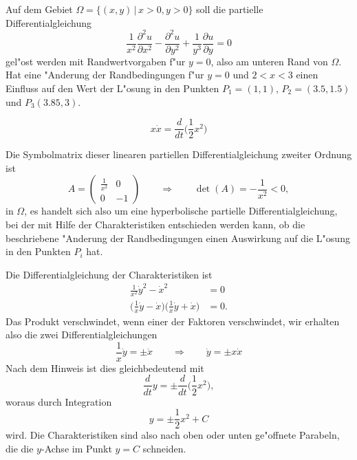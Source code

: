 Auf dem Gebiet $\Omega = \{(x,y)\,|\, x>0,y>0\}$ soll die partielle
Differentialgleichung
\begin{equation}
\frac1{x^2}\frac{\partial^2u}{\partial x^2}
-\frac{\partial^2 u}{\partial y^2}+\frac1{y^3}\frac{\partial u}{\partial y}=0
\label{90000012:equation}
\end{equation}
gel"ost werden mit Randwertvorgaben f"ur $y=0$, also am unteren Rand von
$\Omega$.
Hat eine "Anderung der Randbedingungen f"ur $y=0$ und $2<x<3$ einen Einfluss
auf den Wert der L"osung in den Punkten 
$P_1=(1,1)$, $P_2=(3.5,1.5)$ und $P_3(3.85,3)$.

\begin{hinweis}
\[
x\dot x=\frac{d}{dt}\bigl(
{\textstyle \frac12}x^2
\bigr)
\]
\end{hinweis}

\begin{loesung}
Die Symbolmatrix dieser linearen partiellen Differentialgleichung zweiter
Ordnung ist
\[
A=\begin{pmatrix}
\frac1{x^2}&0\\0&-1
\end{pmatrix}
\qquad
\Rightarrow
\qquad
\det(A)=-\frac1{x^2}<0,
\]
in $\Omega$, es handelt sich also um eine hyperbolische partielle 
Differentialgleichung, bei der mit Hilfe der Charakteristiken
entschieden werden kann, ob die beschriebene "Anderung der Randbedingungen
einen Auswirkung auf die L"osung in den Punkten $P_i$ hat.

Die Differentialgleichung der Charakteristiken ist
\begin{align*}
\frac1{x^2}\dot y^2-\dot x^2&=0
\\
\biggl(\frac1x \dot y-\dot x\biggr)
\biggl(\frac1x \dot y+\dot x\biggr)
&=0.
\end{align*}
Das Produkt verschwindet, wenn einer der Faktoren verschwindet, wir erhalten
also die zwei Differentialgleichungen
\[
\frac1x\dot y=\pm\dot x
\qquad
\Rightarrow
\qquad
\dot y=\pm x\dot x
\]
Nach dem Hinweis ist dies gleichbedeutend mit
\[
\frac{d}{dt}y
=
\pm
\frac{d}{dt}
\biggl(
\frac12
x^2
\biggr),
\]
woraus durch Integration 
\[
y=\pm\frac12x^2+C
\]
wird.
Die Charakteristiken sind also nach oben oder unten ge"offnete Parabeln,
die die $y$-Achse im Punkt $y=C$ schneiden.


\end{loesung}
